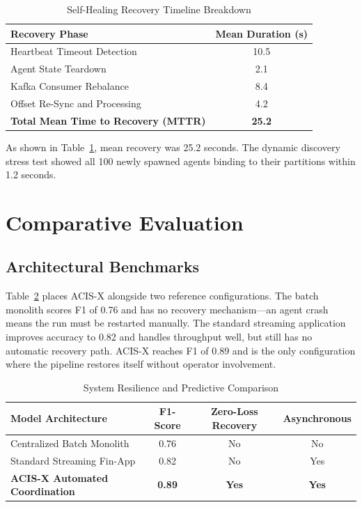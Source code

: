 \documentclass[runningheads]{llncs}
\begin{document}
\begin{table}[ht]
\centering
\caption{Self-Healing Recovery Timeline Breakdown}
\label{tab:recovery}
\begin{tabular}{@{}lc@{}}
\toprule
\textbf{Recovery Phase} & \textbf{Mean Duration (s)} \\ \midrule
Heartbeat Timeout Detection & 10.5 \\
Agent State Teardown & 2.1 \\
Kafka Consumer Rebalance & 8.4 \\
Offset Re-Sync and Processing & 4.2 \\ \midrule
\textbf{Total Mean Time to Recovery (MTTR)} & \textbf{25.2} \\ \bottomrule
\end{tabular}
\end{table}

As shown in Table~\ref{tab:recovery}, mean recovery was 25.2 seconds. The dynamic discovery stress test showed all 100 newly spawned agents binding to their partitions within 1.2 seconds.

\section{Comparative Evaluation}

\subsection{Architectural Benchmarks}
Table~\ref{tab:comparison} places ACIS-X alongside two reference configurations. The batch monolith scores F1 of 0.76 and has no recovery mechanism---an agent crash means the run must be restarted manually. The standard streaming application improves accuracy to 0.82 and handles throughput well, but still has no automatic recovery path. ACIS-X reaches F1 of 0.89 and is the only configuration where the pipeline restores itself without operator involvement.

\begin{table}[ht]
\centering
\caption{System Resilience and Predictive Comparison}
\label{tab:comparison}
\begin{tabular}{@{}lccc@{}}
\toprule
\textbf{Model Architecture} & \textbf{F1-Score} & \textbf{Zero-Loss Recovery} & \textbf{Asynchronous} \\ \midrule
Centralized Batch Monolith & 0.76 & No & No \\
Standard Streaming Fin-App & 0.82 & No & Yes \\
\textbf{ACIS-X Automated Coordination} & \textbf{0.89} & \textbf{Yes} & \textbf{Yes} \\ \bottomrule
\end{tabular}
\end{table}
\end{document}
